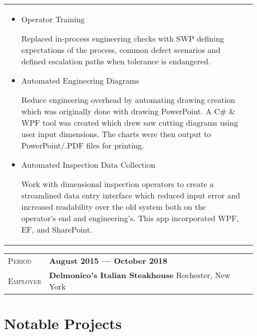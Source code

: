 \documentclass[a4paper, oneside, final, 10pt]{scrartcl} %
\newcommand{\gray}{\rowcolor[gray]{.90}} %
\newcommand{\Csharp}{C{\lserif\#}}
\begin{document}
\begin{center}
\begin{tabularx}{0.97\linewidth}{X|X}
\begin{itemize}
\begin{sloppypar}
        \end{sloppypar}
        \item{Operator Training}
        \begin{sloppypar}
            Replaced in-process engineering checks with SWP defining expectations of the process, common defect scenarios
            and defined escalation paths when tolerance is endangered.
        \end{sloppypar}
        \item {Automated Engineering Diagrams}
        \begin{sloppypar}
            Reduce engineering overhead by automating drawing creation which was originally done with drawing PowerPoint.
            A \Csharp{} \&{} WPF tool was created which drew saw cutting diagrams using user input dimensions. The charts were
            then output to PowerPoint/.PDF files for printing.
        \end{sloppypar}
        \item {Automated Inspection Data Collection}
        \begin{sloppypar}
            Work with dimensional inspection operators to create a streamlined data entry interface which reduced
            input error and increased readability over the old system both on the operator's end and engineering's. This
            app incorporated WPF, EF, and SharePoint.
        \end{sloppypar}
    \end{itemize}
\end{tabularx}

\begin{tabularx}{0.97\linewidth}{>{\raggedleft\scshape}p{2cm}X}
    \gray{}Period & \textbf{August 2015 --- October 2018}\\
    \gray{}Employer & \textbf{Delmonico's Italian Steakhouse} \hfill Rochester,  New York\\
\end{tabularx}


\section{Notable Projects}


\end{center}
\end{document}
